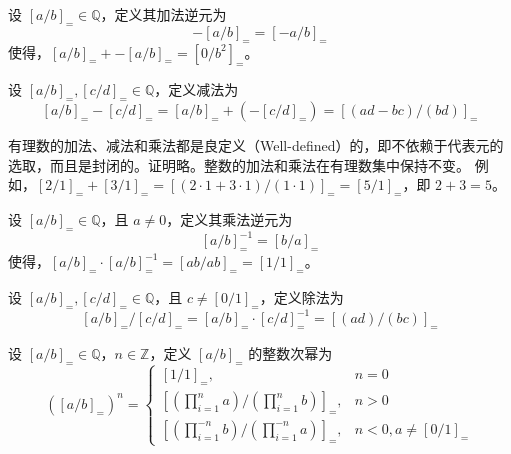 \begin{definition}
    设 $[a/b]_{=}\in\mathbb{Q}$，定义其加法逆元为
    \[
        -[a/b]_{=} = [-a/b]_{=}
    \]
    使得，$[a/b]_{=} + -[a/b]_{=} = [0/b^2]_{=}$。
\end{definition}

\begin{definition}
    设 $[a/b]_{=},[c/d]_{=}\in\mathbb{Q}$，定义减法为
    \[
        [a/b]_{=} - [c/d]_{=} = [a/b]_{=} + (-[c/d]_{=}) = [(ad-bc)/(bd)]_{=}
    \]
\end{definition}

\vspace{1em}

\begin{note}
    有理数的加法、减法和乘法都是良定义（Well-defined）的，即不依赖于代表元的选取，而且是封闭的。证明略。整数的加法和乘法在有理数集中保持不变。
    例如，$[2/1]_{=} + [3/1]_{=} = [(2\cdot1+3\cdot1)/(1\cdot1)]_{=} = [5/1]_{=}$，即 $2+3=5$。
\end{note}

\vspace{1em}

\begin{definition}
    设 $[a/b]_{=}\in\mathbb{Q}$，且 $a\neq 0$，定义其乘法逆元为
    \[
        [a/b]_{=}^{-1} = [b/a]_{=}
    \]
    使得，$[a/b]_{=} \cdot [a/b]_{=}^{-1} = [ab/ab]_{=} = [1/1]_{=}$。
\end{definition}

\begin{definition}
    设 $[a/b]_{=},[c/d]_{=}\in\mathbb{Q}$，且 $c\neq [0/1]_{=}$，定义除法为
    \[
        [a/b]_{=} / [c/d]_{=} = [a/b]_{=} \cdot [c/d]_{=}^{-1} = [(ad)/(bc)]_{=}
    \]
\end{definition}

\vspace{1em}

\begin{definition}
    设 $[a/b]_{=}\in\mathbb{Q}$，$n\in\mathbb{Z}$，定义 $[a/b]_{=}$ 的整数次幂为
    \[
        ([a/b]_{=})^n = 
        \begin{cases}
            [1/1]_{=}, & n=0 \\
            [(\prod_{i=1}^{n} a)/(\prod_{i=1}^{n}b)]_{=}, & n>0 \\
            [(\prod_{i=1}^{-n} b)/(\prod_{i=1}^{-n}a)]_{=}, & n<0, a\neq [0/1]_{=}
        \end{cases}
    \]
\end{definition}

